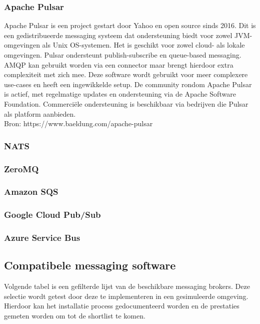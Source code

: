 \subsubsection{Apache Pulsar}
Apache Pulsar is een project gestart door Yahoo en open source sinds 2016.
Dit is een gedistribueerde messaging systeem dat ondersteuning biedt voor zowel JVM-omgevingen als Unix OS-systemen.
Het is geschikt voor zowel cloud- als lokale omgevingen. 
Pulsar ondersteunt publish-subscribe en queue-based messaging.
AMQP kan gebruikt worden via een connector maar brengt hierdoor extra complexiteit met zich mee.
Deze software wordt gebruikt voor meer complexere use-cases en heeft een ingewikkelde setup.
De community rondom Apache Pulsar is actief, met regelmatige updates en ondersteuning via de Apache Software Foundation. 
Commerciële ondersteuning is beschikbaar via bedrijven die Pulsar als platform aanbieden.
\\
Bron: https://www.baeldung.com/apache-pulsar

\subsubsection{NATS}

\subsubsection{ZeroMQ}

\subsubsection{Amazon SQS}

\subsubsection{Google Cloud Pub/Sub}

\subsubsection{Azure Service Bus}

\newpage
\subsection{Compatibele messaging software}
Volgende tabel is een gefilterde lijst van de beschikbare messaging brokers.
Deze selectie wordt getest door deze te implementeren in een gesimuleerde omgeving.
Hierdoor kan het installatie process gedocumenteerd worden en de prestaties gemeten worden om tot de shortlist te komen.

